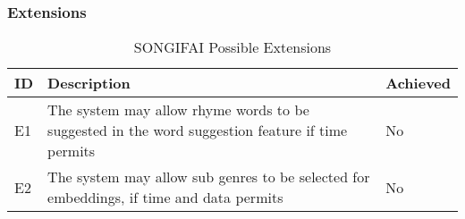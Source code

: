 \subsubsection{Extensions}
\begin{table}[ht]
	\centering
	\begin{tabular}{ | l | p{10cm} | l | }
		\hline
		\textbf{ID} & \textbf{Description} & \textbf{Achieved} \\ \hline
		E1 & The system may allow rhyme words to be suggested in the word suggestion feature if time permits& No \\ \hline
		E2 & The system may allow sub genres to be selected for embeddings, if time and data permits& No \\ \hline
	\end{tabular}
	\label{Tab:Tcr}
	\caption[Possible Extensions]{SONGIFAI Possible Extensions}
\end{table}
